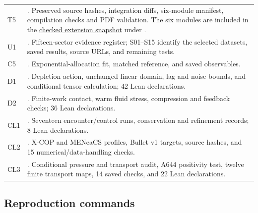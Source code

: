 \begin{longtable}{P{.065\textwidth}P{.88\textwidth}}
T5 & .
Preserved source hashes, integration diffs, six-module manifest, compilation
checks and PDF validation. The six modules are included in the
\href{https://github.com/jakechinitz/Entropic-EFT-Lean/tree/a6552daf39daf83d5159fcbcda698d1801731d24}{checked extension snapshot}
under . \\
U1 & .
Fifteen-sector evidence register; S01--S15 identify the selected datasets,
saved results, source URLs, and remaining tests. \\
C5 & .
Exponential-allocation fit, matched reference, and saved observables. \\
D1 & .
Depletion action, unchanged linear domain, lag and noise bounds, and
conditional tensor calculation; 42 Lean declarations. \\
D2 & .
Finite-work contact, warm fluid stress, compression and feedback checks;
36 Lean declarations. \\
CL1 & .
Seventeen encounter/control runs, conservation and refinement records;
8 Lean declarations. \\
CL2 & .
X-COP and MENeaCS profiles, Bullet v1 targets, source hashes, and
15 numerical/data-handling checks. \\
CL3 & .
Conditional pressure and transport audit, A644 positivity test, twelve
finite transport maps, 14 saved checks, and 22 Lean declarations. \\
\bottomrule
\end{longtable}
\normalsize

\subsection{Reproduction commands}

